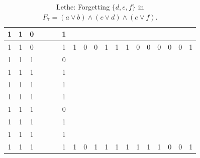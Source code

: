 \begin{table}[!tb]
\begin{tabular}{|c|c|c|c|c|c|c|c|c|c|c|c|c|c|c|c|c|c|c|}
        \rowcolor{blue!40} 1 & 1 & 0 &  &  &  & 1 &  &  &  &  &  &  &  &  &  &  &  &  \\ \hline
        \rowcolor{blue!40} 1 & 1 & 0 &  &  &  & 1 & 1 & 0 & 0 & 1 & 1 & 1 & 0 & 0 & 0 & 0 & 0 & 1 \\ \hline
        \rowcolor{red!40} 1 & 1 & 1 &  &  &  & 0 &  &  &  &  &  &  &  &  &  &  &  &  \\ \hline
        \rowcolor{red!40} 1 & 1 & 1 &  &  &  & 1 &  &  &  &  &  &  &  &  &  &  &  &  \\ \hline
        \rowcolor{red!40} 1 & 1 & 1 &  &  &  & 1 &  &  &  &  &  &  &  &  &  &  &  &  \\ \hline
        \rowcolor{red!40} 1 & 1 & 1 &  &  &  & 1 &  &  &  &  &  &  &  &  &  &  &  &  \\ \hline
        \rowcolor{red!40} 1 & 1 & 1 &  &  &  & 0 &  &  &  &  &  &  &  &  &  &  &  &  \\ \hline
        \rowcolor{red!40} 1 & 1 & 1 &  &  &  & 1 &  &  &  &  &  &  &  &  &  &  &  &  \\ \hline
        \rowcolor{red!40} 1 & 1 & 1 &  &  &  & 1 &  &  &  &  &  &  &  &  &  &  &  &  \\ \hline
        \rowcolor{red!40} 1 & 1 & 1 &  &  &  & 1 & 1 & 0 & 1 & 1 & 1 & 1 & 1 & 1 & 1 & 0 & 0 & 1 \\ \hline
    \end{tabular}
    \caption{Lethe: Forgetting $\{d, e, f\}$ in $F_{7} = (a \lor b) \land (c \lor d) \land (e \lor f)$.}
    \label{tab:lethe-F7-def}
\end{table}
